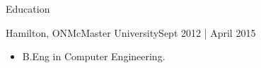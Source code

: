 \documentclass[]{mcdowellcv}
\begin{document}
\begin{cvsection}{Education}
	\begin{cvsubsection}{Hamilton, ON}{McMaster University}{Sept 2012 | April 2015}
		\begin{itemize}
			\item B.Eng in Computer Engineering.
		\end{itemize}
	\end{cvsubsection}
\end{cvsection}


\ 
\end{document}
